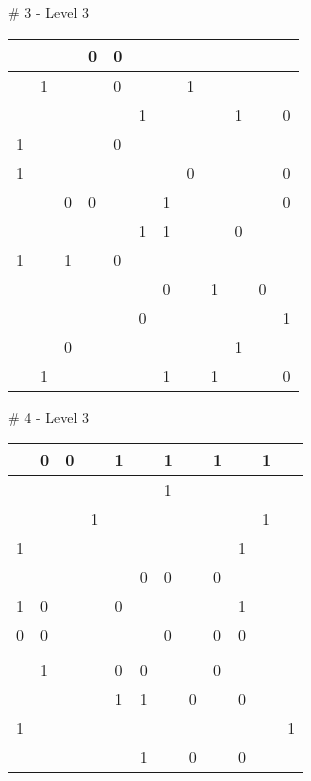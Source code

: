 \# 3 - Level 3 \newline
\begin{tabular}{|m{\collen}|m{\collen}|m{\collen}|m{\collen}|m{\collen}|m{\collen}|m{\collen}|m{\collen}|m{\collen}|m{\collen}|m{\collen}|m{\collen}|}
\hline
    &   &   & 0 & 0 &   &   &   &   &   &   &   \\
\hline
    & 1 &   &   & 0 &   &   & 1 &   &   &   &   \\
\hline
    &   &   &   &   & 1 &   &   &   & 1 &   & 0 \\
\hline
  1 &   &   &   & 0 &   &   &   &   &   &   &   \\
\hline
  1 &   &   &   &   &   &   & 0 &   &   &   & 0 \\
\hline
    &   & 0 & 0 &   &   & 1 &   &   &   &   & 0 \\
\hline
    &   &   &   &   & 1 & 1 &   &   & 0 &   &   \\
\hline
  1 &   & 1 &   & 0 &   &   &   &   &   &   &   \\
\hline
    &   &   &   &   &   & 0 &   & 1 &   & 0 &   \\
\hline
    &   &   &   &   & 0 &   &   &   &   &   & 1 \\
\hline
    &   & 0 &   &   &   &   &   &   & 1 &   &   \\
\hline
    & 1 &   &   &   &   & 1 &   & 1 &   &   & 0 \\
\hline
\end{tabular}


\medskip

\# 4 - Level 3 \newline
\begin{tabular}{|m{\collen}|m{\collen}|m{\collen}|m{\collen}|m{\collen}|m{\collen}|m{\collen}|m{\collen}|m{\collen}|m{\collen}|m{\collen}|m{\collen}|}
\hline
    & 0 & 0 &   & 1 &   & 1 &   & 1 &   & 1 &   \\
\hline
    &   &   &   &   &   & 1 &   &   &   &   &   \\
\hline
    &   &   & 1 &   &   &   &   &   &   & 1 &   \\
\hline
  1 &   &   &   &   &   &   &   &   & 1 &   &   \\
\hline
    &   &   &   &   & 0 & 0 &   & 0 &   &   &   \\
\hline
  1 & 0 &   &   & 0 &   &   &   &   & 1 &   &   \\
\hline
  0 & 0 &   &   &   &   & 0 &   & 0 & 0 &   &   \\
\hline
    &   &   &   &   &   &   &   &   &   &   &   \\
\hline
    & 1 &   &   & 0 & 0 &   &   & 0 &   &   &   \\
\hline
    &   &   &   & 1 & 1 &   & 0 &   & 0 &   &   \\
\hline
  1 &   &   &   &   &   &   &   &   &   &   & 1 \\
\hline
    &   &   &   &   & 1 &   & 0 &   & 0 &   &   \\
\hline
\end{tabular}


